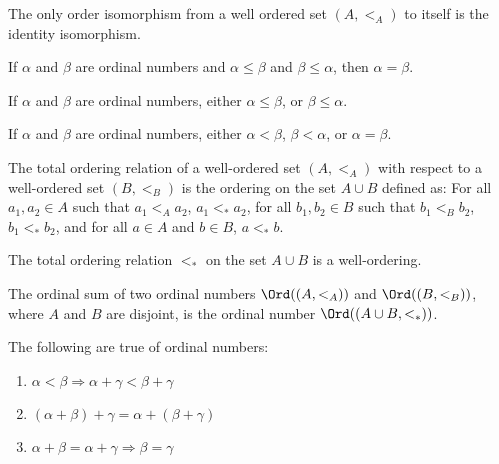     \begin{theorem}
        The only order isomorphism from a well ordered set $(A,<_{A})$ to
        itself is the identity isomorphism.
    \end{theorem}
    \begin{theorem}
        If $\alpha$ and $\beta$ are ordinal numbers and
        ${\alpha}\leq{\beta}$ and ${\beta}\leq{\alpha}$,
        then $\alpha=\beta$.
    \end{theorem}
    \begin{theorem}
        If $\alpha$ and $\beta$ are ordinal numbers, either
        ${\alpha}\leq{\beta}$, or ${\beta}\leq{\alpha}$.
    \end{theorem}
    \begin{theorem}
        If $\alpha$ and $\beta$ are ordinal numbers, either
        $\alpha<\beta$, $\beta<\alpha$, or $\alpha=\beta$.
    \end{theorem}
    \begin{definition}
        The total ordering relation of a well-ordered set $(A,<_{A})$
        with respect
       to a well-ordered set $(B,<_{B})$ is the ordering
       on the set ${A}\cup{B}$ defined as: For all
       $a_{1},a_{2}\in{A}$ such that $a_{1}<_{A}a_{2}$,
       $a_{1}<_{*}a_{2}$, for all $b_{1},b_{2}\in{B}$
       such that $b_{1}<_{B}b_{2}$, $b_{1}<_{*}b_{2}$,
       and for all ${a}\in{A}$ and ${b}\in{B}$,
       ${a}<_{*}{b}$.
    \end{definition}
    \begin{theorem}
       The total ordering relation $<_{*}$ on the set
       ${A}\cup{B}$ is a well-ordering.
    \end{theorem}
    \begin{definition}
        The ordinal sum of two ordinal numbers $\Ord((A,<_{A}))$ and
        $\Ord((B,<_{B}))$, where $A$ and $B$ are disjoint, is the ordinal
        number $\Ord(({A}\cup{B},<_{*}))$.
    \end{definition}
    \begin{theorem}
       The following are true of ordinal numbers:
       \begin{enumerate}
            \item $\alpha<\beta\Rightarrow\alpha+\gamma<\beta+\gamma$
            \item $(\alpha+\beta)+\gamma=\alpha+(\beta+\gamma)$
            \item $\alpha+\beta=\alpha+\gamma\Rightarrow\beta=\gamma$
       \end{enumerate}
    \end{theorem}
